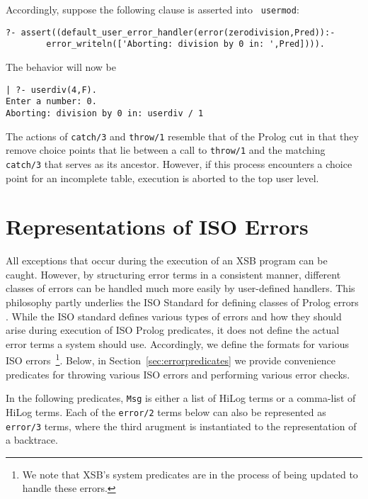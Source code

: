 Accordingly, suppose the following clause is asserted into {\tt
usermod}:
%
\begin{small}
\begin{verbatim}
?- assert((default_user_error_handler(error(zerodivision,Pred)):- 
        error_writeln(['Aborting: division by 0 in: ',Pred]))).
\end{verbatim}
\end{small}
%
The behavior will now be
\begin{small}
\begin{verbatim}
| ?- userdiv(4,F).
Enter a number: 0.
Aborting: division by 0 in: userdiv / 1
\end{verbatim}
\end{small}
The actions of {\tt catch/3} and {\tt throw/1} resemble that of the
Prolog cut in that they remove choice points that lie between a call
to {\tt throw/1} and the matching {\tt catch/3} that serves as its
ancestor.  However, if this process encounters a choice point for an
incomplete table, execution is aborted to the top user level.

\section{Representations of ISO Errors} \label{sec:iso-errors}

All exceptions that occur during the execution of an XSB program can
be caught.  However, by structuring error terms in a consistent
manner, different classes of errors can be handled much more easily by
user-defined handlers.  This philosophy partly underlies the ISO
Standard for defining classes of Prolog errors \cite{ISO-Prolog}.
While the ISO standard defines various types of errors and how they
should arise during execution of ISO Prolog predicates, it does not
define the actual error terms a system should use.  Accordingly, we
define the formats for various ISO errors~\footnote{We note that XSB's
  system predicates are in the process of being updated to handle
  these errors.}.  Below, in Section~\ref{sec:errorpredicates} we
provide convenience predicates for throwing various ISO errors and
performing various error checks.

In the following predicates, {\tt Msg} is either a list of HiLog terms
or a comma-list of HiLog terms.  Each of the {\tt error/2} terms below
can also be represented as {\tt error/3} terms, where the third
arugment is instantiated to the representation of a backtrace.

